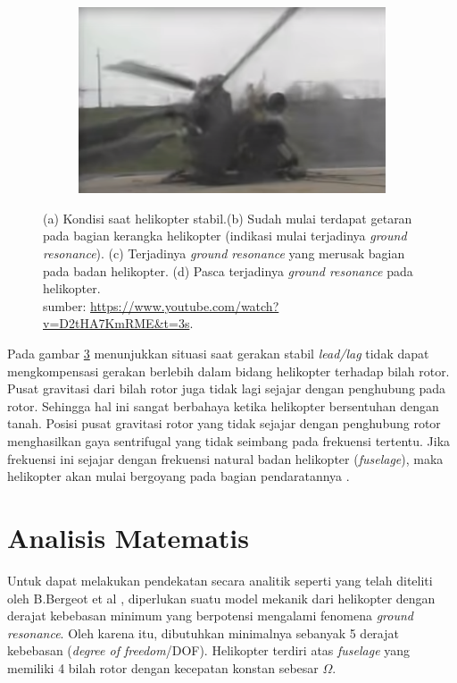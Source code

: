 \begin{figure}[H]
\begin{subfigure}{0.4\textwidth}
		\caption{}
		\label{fig:gr_3}
	\end{subfigure}
	\centering
	\begin{subfigure}{0.4\textwidth}
		\centering
		\includegraphics[width=\linewidth]{gambar/gr_4.png}
		\caption{}
		\label{fig:gr_4}
	\end{subfigure}
		\caption{(a) Kondisi saat helikopter stabil.(b) Sudah mulai terdapat getaran pada bagian kerangka helikopter (indikasi mulai terjadinya \textit{ground resonance}). (c) Terjadinya \textit{ground resonance} yang merusak bagian pada badan helikopter. (d) Pasca terjadinya \textit{ground resonance} pada helikopter.\\
		sumber: \url{https://www.youtube.com/watch?v=D2tHA7KmRME&t=3s}.}
		\label{fig:gr}
\end{figure}

Pada gambar \ref{fig:gr} menunjukkan situasi saat gerakan stabil \textit{lead/lag} tidak dapat mengkompensasi gerakan berlebih dalam bidang helikopter terhadap bilah rotor. Pusat gravitasi dari bilah rotor juga tidak lagi sejajar dengan penghubung pada rotor. Sehingga hal ini sangat berbahaya ketika helikopter bersentuhan dengan tanah. Posisi pusat gravitasi rotor yang tidak sejajar dengan penghubung rotor menghasilkan gaya sentrifugal yang tidak seimbang pada frekuensi tertentu. Jika frekuensi ini sejajar dengan frekuensi natural badan helikopter (\textit{fuselage}), maka helikopter akan mulai bergoyang pada bagian pendaratannya \cite{Eckert2007AnalyticalAA}.

\section{Analisis Matematis}

Untuk dapat melakukan pendekatan secara analitik seperti yang telah diteliti oleh B.Bergeot et al \cite{BERGEOT201672}, diperlukan suatu model mekanik dari helikopter dengan derajat kebebasan minimum yang berpotensi mengalami fenomena \textit{ground resonance}. Oleh karena itu, dibutuhkan minimalnya sebanyak 5 derajat kebebasan (\textit{degree of freedom}/DOF). Helikopter terdiri atas \textit{fuselage} yang memiliki 4 bilah rotor dengan kecepatan konstan sebesar $\Omega$.

